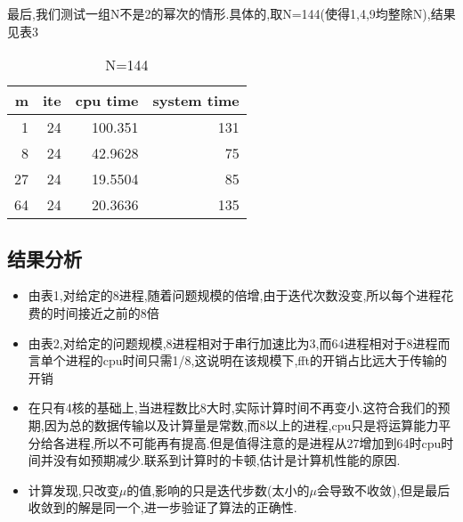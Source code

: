 \documentclass[UTF8]{ctexart}
\begin{document}
最后,我们测试一组N不是2的幂次的情形.具体的,取N=144(使得1,4,9均整除N),结果见表3
\begin{table}\caption{N=144}
\centering
\begin{tabular}{|r|r|r|r|}
\hline
m & ite & cpu time&system time  \\ \hline
   1 & 24& 100.351 &131 \\
    8&  24& 42.9628 &75	 \\ 
    27& 24& 19.5504 & 85 \\
    64 & 24&20.3636 & 135\\
\hline
\end{tabular}
\subsection{结果分析}
\begin{itemize}
\item 由表1,对给定的8进程,随着问题规模的倍增,由于迭代次数没变,所以每个进程花费的时间接近之前的8倍
\item 由表2,对给定的问题规模,8进程相对于串行加速比为3,而64进程相对于8进程而言单个进程的cpu时间只需1/8,这说明在该规模下,fft的开销占比远大于传输的开销
\item 在只有4核的基础上,当进程数比8大时,实际计算时间不再变小.这符合我们的预期,因为总的数据传输以及计算量是常数,而8以上的进程,cpu只是将运算能力平分给各进程,所以不可能再有提高.但是值得注意的是进程从27增加到64时cpu时间并没有如预期减少.联系到计算时的卡顿,估计是计算机性能的原因.
\item 计算发现,只改变$\mu$的值,影响的只是迭代步数(太小的$\mu$会导致不收敛),但是最后收敛到的解是同一个,进一步验证了算法的正确性.
\end{itemize}
\end{table}
\end{document}
